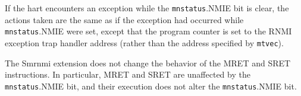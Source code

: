 If the hart encounters an exception while the {\tt mnstatus}.NMIE bit is
clear, the actions taken are the same as if the exception had occurred while
{\tt mnstatus}.NMIE were set, except that the program counter is set to the
RNMI exception trap handler address (rather than the address specified by
{\tt mtvec}).

\begin{commentary}
The Smrnmi extension does not change the behavior of the MRET and SRET
instructions.
In particular, MRET and SRET are unaffected by the {\tt mnstatus}.NMIE bit,
and their execution does not alter the {\tt mnstatus}.NMIE bit.
\end{commentary}
